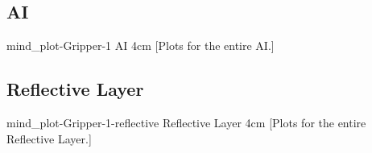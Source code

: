 {\newpage
  \noindent\begin{minipage}{\textwidth}
    \subsection{AI}
    \experimentcausegroupplots{\dataappendixmaxtime}
                              {\dataappendixexperimentonemaxtime}
                              {\dataappendixexperimenttwomaxtime}
                              {\dataappendixexperimentthreemaxtime}
                              {\dataappendixexperimentonename}
                              {\dataappendixexperimenttwoname}
                              {\dataappendixexperimentthreename}
                              {\dataappendixexperimentoneprettyname}
                              {\dataappendixexperimenttwoprettyname}
                              \experimentcausegroupplotscontinued{\dataappendixexperimentthreeprettyname}
                                                                 {mind_plot-Gripper-1}
                                                                 {AI}
                                                                 {\experimentdatacommontablereference}
                                                                 {4cm}
    \experimentdatablocksworldexample
    [Plots for the entire
      AI.]{}
  \label{figure:mind_plot-Gripper-1}
  \end{minipage}
}
{\newpage
  \noindent\begin{minipage}{\textwidth}
    \subsection{Reflective Layer}
    \experimentcausegroupplots{\dataappendixmaxtime}
                              {\dataappendixexperimentonemaxtime}
                              {\dataappendixexperimenttwomaxtime}
                              {\dataappendixexperimentthreemaxtime}
                              {\dataappendixexperimentonename}
                              {\dataappendixexperimenttwoname}
                              {\dataappendixexperimentthreename}
                              {\dataappendixexperimentoneprettyname}
                              {\dataappendixexperimenttwoprettyname}
                              \experimentcausegroupplotscontinued{\dataappendixexperimentthreeprettyname}
                                                                 {mind_plot-Gripper-1-reflective}
                                                                 {Reflective Layer}
                                                                 {\experimentdatacommontablereference}
                                                                 {4cm}
    \experimentdatablocksworldexample
    [Plots for the entire
      Reflective Layer.]{}
  \label{figure:mind_plot-Gripper-1-reflective}
  \end{minipage}
}
